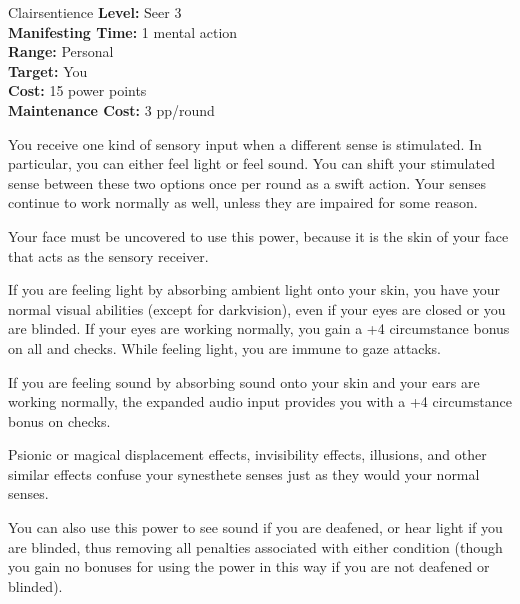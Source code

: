 {Clairsentience}
{
	\textbf{Level:}
	Seer 3\\
	\textbf{Manifesting Time:}
	1 mental action\\
	\textbf{Range:}
	Personal\\
	\textbf{Target:}
	You\\
	\textbf{Cost:}
	15 power points\\
	\textbf{Maintenance Cost:}
	3 pp/round\\
}
{
	You receive one kind of sensory input when a different sense is stimulated. In particular, you can either feel light or feel sound. You can shift your stimulated sense between these two options once per round as a swift action. Your senses continue to work normally as well, unless they are impaired for some reason.

	Your face must be uncovered to use this power, because it is the skin of your face that acts as the sensory receiver.

	If you are feeling light by absorbing ambient light onto your skin, you have your normal visual abilities (except for darkvision), even if your eyes are closed or you are blinded. If your eyes are working normally, you gain a +4 circumstance bonus on all  and  checks. While feeling light, you are immune to gaze attacks.

	If you are feeling sound by absorbing sound onto your skin and your ears are working normally, the expanded audio input provides you with a +4 circumstance bonus on  checks.

	Psionic or magical displacement effects, invisibility effects, illusions, and other similar effects confuse your synesthete senses just as they would your normal senses.

	You can also use this power to see sound if you are deafened, or hear light if you are blinded, thus removing all penalties associated with either condition (though you gain no bonuses for using the power in this way if you are not deafened or blinded).
}